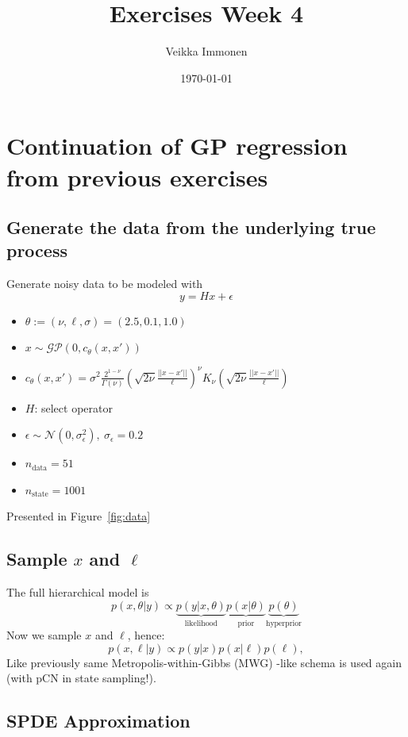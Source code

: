 \documentclass[times, a4paper, 12pt, onecolumn, oneside]{article}
\date{}
\title{ Exercises Week 4}
\author{Veikka Immonen}
\date{\today}
\begin{document}
\maketitle

\section{Continuation of GP regression from previous exercises}

\subsection{Generate the data from the underlying true process}

Generate noisy data to be modeled with
\[
y = Hx + \epsilon
\]
\begin{itemize}
\item $\theta := (\nu, \ell, \sigma) = (2.5, 0.1, 1.0)$
\item $x \sim \mathcal{GP}(0, c_\theta(x, x'))$
\item $c_\theta(x, x') = \sigma^2 \frac{2^{1 - \nu}}{\Gamma(\nu)}\left(\sqrt{2\nu}\frac{||x - x'||}{\ell}\right)^\nu K_\nu\left(\sqrt{2\nu}\frac{||x - x'||}{\ell}\right)$
\item $H$: select operator
\item $\epsilon \sim \mathcal{N}(0, \sigma_\epsilon^2), ~ \sigma_\epsilon = 0.2$ 
\item $n_\text{data} = 51$
\item $n_\text{state} = 1001$
\end{itemize}
Presented in Figure~\ref{fig:data}

\subsection{Sample $x$ and $\ell$}

The full hierarchical model is
\[
p(x, \theta | y) \propto \underbrace{p(y | x, \theta)}_\text{likelihood} \underbrace{p(x | \theta)}_\text{prior} \underbrace{p(\theta)}_\text{hyperprior}
\]
Now we sample $x$ and $\ell$, hence:
\[
p(x, \ell | y) \propto p(y | x) p(x | \ell) p(\ell),
\]
Like previously same Metropolis-within-Gibbs (MWG) -like schema is used again (with pCN in state sampling!).

\subsection{SPDE Approximation}
\end{document}
